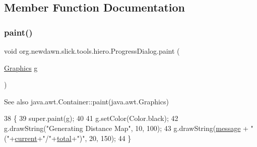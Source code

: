 \subsection{Member Function Documentation}
\mbox{\label{classorg_1_1newdawn_1_1slick_1_1tools_1_1hiero_1_1_progress_dialog_ab20af450e284c7b3e838b45c40389ab0}} 
\subsubsection{\texorpdfstring{paint()}{paint()}}
{\footnotesize\ttfamily void org.\+newdawn.\+slick.\+tools.\+hiero.\+Progress\+Dialog.\+paint (\begin{DoxyParamCaption}\item[{\mbox{\hyperlink{classorg_1_1newdawn_1_1slick_1_1_graphics}{Graphics}}}]{g }\end{DoxyParamCaption})\hspace{0.3cm}{\ttfamily [inline]}}

\begin{DoxySeeAlso}{See also}
java.\+awt.\+Container\+::paint(java.\+awt.\+Graphics) 
\end{DoxySeeAlso}

\begin{DoxyCode}
38                                   \{
39         super.paint(g);
40         
41         g.setColor(Color.black);
42         g.drawString(\textcolor{stringliteral}{"Generating Distance Map"}, 10, 100);
43         g.drawString(\mbox{\hyperlink{classorg_1_1newdawn_1_1slick_1_1tools_1_1hiero_1_1_progress_dialog_acd9d79724bb00dac233a3fb61df9b3e8}{message}} + \textcolor{stringliteral}{"("}+\mbox{\hyperlink{classorg_1_1newdawn_1_1slick_1_1tools_1_1hiero_1_1_progress_dialog_aba73b86e01e2e9a3cde55146ce905aa5}{current}}+\textcolor{stringliteral}{"/"}+\mbox{\hyperlink{classorg_1_1newdawn_1_1slick_1_1tools_1_1hiero_1_1_progress_dialog_a7facb05047f254e898637bdfde4d3000}{total}}+\textcolor{stringliteral}{")"}, 20, 150);
44     \}
\end{DoxyCode}
\mbox{\label{classorg_1_1newdawn_1_1slick_1_1tools_1_1hiero_1_1_progress_dialog_a4adf31baf5b6bd6056548bfa991aadb1}} 
